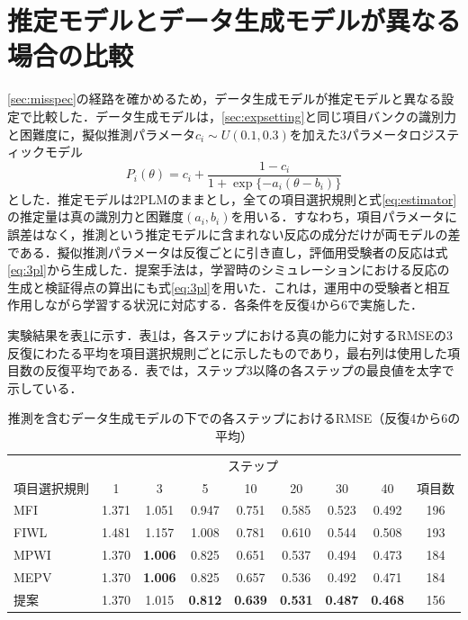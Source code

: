 \documentclass[a4paper,12pt,oneside,openany]{jsbook}
\begin{document}
\section{推定モデルとデータ生成モデルが異なる場合の比較}\label{sec:misspecexp}

\ref{sec:misspec}の経路を確かめるため，データ生成モデルが推定モデルと異なる設定で比較した．データ生成モデルは，\ref{sec:expsetting}と同じ項目バンクの識別力と困難度に，擬似推測パラメータ$c_i\sim U(0.1,0.3)$を加えた3パラメータロジスティックモデル
\begin{equation}
 P_i(\theta)=c_i+\frac{1-c_i}{1+\exp\{-a_i(\theta-b_i)\}}
 \label{eq:3pl}
\end{equation}
とした．推定モデルは2PLMのままとし，全ての項目選択規則と式\eqref{eq:estimator}の推定量は真の識別力と困難度$(a_i,b_i)$を用いる．すなわち，項目パラメータに誤差はなく，推測という推定モデルに含まれない反応の成分だけが両モデルの差である．擬似推測パラメータは反復ごとに引き直し，評価用受験者の反応は式\eqref{eq:3pl}から生成した．提案手法は，学習時のシミュレーションにおける反応の生成と検証得点の算出にも式\eqref{eq:3pl}を用いた．これは，運用中の受験者と相互作用しながら学習する状況に対応する．各条件を反復4から6で実施した．

実験結果を表\ref{tab:guess}に示す．表\ref{tab:guess}は，各ステップにおける真の能力に対するRMSEの3反復にわたる平均を項目選択規則ごとに示したものであり，最右列は使用した項目数の反復平均である．表では，ステップ3以降の各ステップの最良値を太字で示している．

\begin{table}[t]
\centering
\caption{推測を含むデータ生成モデルの下での各ステップにおけるRMSE（反復4から6の平均）}
\label{tab:guess}
\footnotesize
\setlength{\tabcolsep}{2pt}
\begin{tabular}{lcccccccc}
\hline
 & \multicolumn{7}{c}{ステップ} & \\
項目選択規則 & 1 & 3 & 5 & 10 & 20 & 30 & 40 & 項目数\\
\hline
MFI & 1.371 & 1.051 & 0.947 & 0.751 & 0.585 & 0.523 & 0.492 & 196\\
FIWL & 1.481 & 1.157 & 1.008 & 0.781 & 0.610 & 0.544 & 0.508 & 193\\
MPWI & 1.370 & \textbf{1.006} & 0.825 & 0.651 & 0.537 & 0.494 & 0.473 & 184\\
MEPV & 1.370 & \textbf{1.006} & 0.825 & 0.657 & 0.536 & 0.492 & 0.471 & 184\\
提案 & 1.370 & 1.015 & \textbf{0.812} & \textbf{0.639} & \textbf{0.531} & \textbf{0.487} & \textbf{0.468} & 156\\
\hline
\end{tabular}
\end{table}
\end{document}
